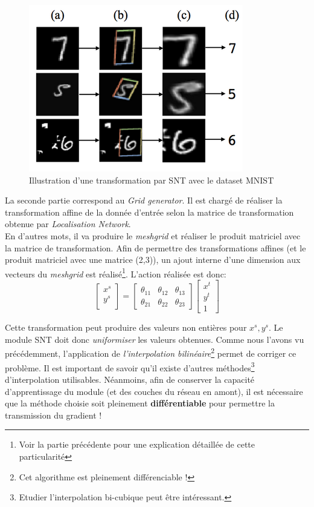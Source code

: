 \begin{figure}
    \centering
    \includegraphics[scale=0.4]{./tex/attention-deep-learning/sntmnist.png}
    \caption{Illustration d'une transformation par SNT avec le dataset MNIST}
    \label{sntransf}
\end{figure}

\noindent La seconde partie correspond au \textit{Grid generator}. Il est chargé de réaliser la transformation affine de la donnée d'entrée selon la matrice de transformation obtenue par \textit{Localisation Network}.\\

\noindent En d'autres mots, il va produire le \textit{meshgrid} et réaliser le produit matriciel avec la matrice de transformation. Afin de permettre des transformations affines (et le produit matriciel avec une matrice (2,3)), un ajout interne d'une dimension aux vecteurs du \textit{meshgrid} est réalisé\footnote{Voir la partie précédente pour une explication détaillée de cette particularité}. L'action réalisée est donc:
$$
\begin{bmatrix}
x^{s} \\
y^{s} \\
\end{bmatrix} = \begin{bmatrix}
\theta_{11} & \theta_{12} & \theta_{13} \\
\theta_{21} & \theta_{22} & \theta_{23}
\end{bmatrix}
%
\begin{bmatrix}
x^t \\
y^t \\
1
\end{bmatrix}$$

\noindent Cette transformation peut produire des valeurs non entières pour $x^{s},y^{s}$. Le module SNT doit donc \textit{uniformiser} les valeurs obtenues. Comme nous l'avons vu précédemment, l'application de \textit{l'interpolation bilinéaire}\footnote{Cet algorithme est pleinement différenciable !} permet de corriger ce problème. Il est important de savoir qu'il existe d'autres méthodes\footnote{Etudier l'interpolation bi-cubique peut être intéressant.} d'interpolation utilisables. Néanmoins, afin de conserver la capacité d'apprentissage du module (et des couches du réseau en amont), il est nécessaire que la méthode choisie soit pleinement \textbf{différentiable} pour permettre la transmission du gradient !\\

